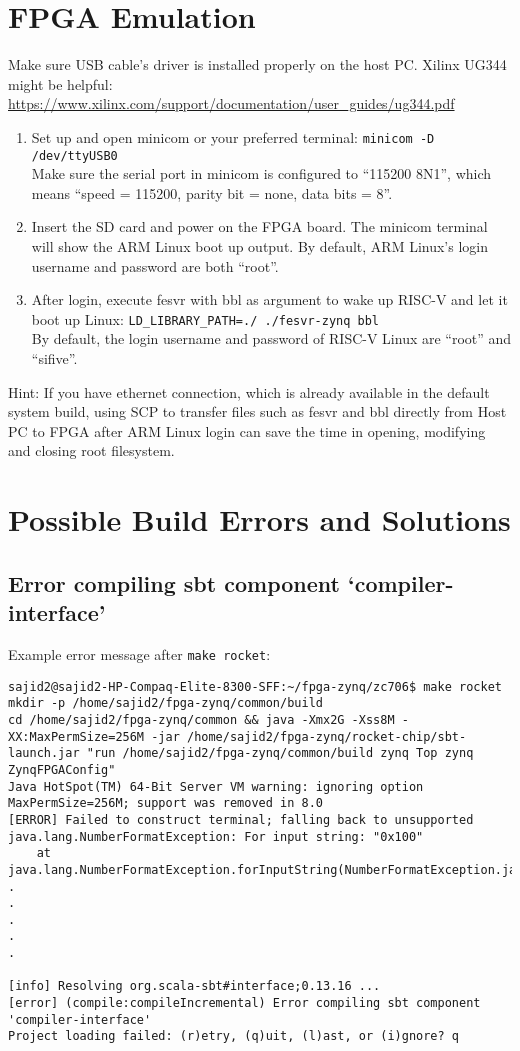 \documentclass[a4paper,11pt]{article}
\begin{document}
\section{FPGA Emulation}
Make sure USB cable's driver is installed properly on the host PC. Xilinx UG344 might be helpful: \url{https://www.xilinx.com/support/documentation/user_guides/ug344.pdf}
\begin{enumerate}
\item Set up and open minicom or your preferred terminal:
{\tt minicom -D /dev/ttyUSB0}\\
Make sure the serial port in minicom is configured to ``115200 8N1'', which means ``speed = 115200, parity bit = none, data bits = 8''.

\item Insert the SD card and power on the FPGA board. The minicom terminal will show the ARM Linux boot up output. By default, ARM Linux's login username and password are both ``root''.

\item After login, execute fesvr with bbl as argument to wake up RISC-V and let it boot up Linux:
{\tt LD\_LIBRARY\_PATH=./ ./fesvr-zynq bbl}\\
By default, the login username and password of RISC-V Linux are ``root'' and ``sifive''.
\end{enumerate}

Hint: If you have ethernet connection, which is already available in the default system build, using SCP to transfer files such as fesvr and bbl directly from Host PC to FPGA after ARM Linux login can save the time in opening, modifying and closing root filesystem.

\section{Possible Build Errors and Solutions}\label{sec_errors}
\subsection{Error compiling sbt component  `compiler-interface'}
Example error message after {\tt make rocket}:
\begin{lstlisting}
sajid2@sajid2-HP-Compaq-Elite-8300-SFF:~/fpga-zynq/zc706$ make rocket
mkdir -p /home/sajid2/fpga-zynq/common/build
cd /home/sajid2/fpga-zynq/common && java -Xmx2G -Xss8M -XX:MaxPermSize=256M -jar /home/sajid2/fpga-zynq/rocket-chip/sbt-launch.jar "run /home/sajid2/fpga-zynq/common/build zynq Top zynq ZynqFPGAConfig"
Java HotSpot(TM) 64-Bit Server VM warning: ignoring option MaxPermSize=256M; support was removed in 8.0
[ERROR] Failed to construct terminal; falling back to unsupported
java.lang.NumberFormatException: For input string: "0x100"
	at java.lang.NumberFormatException.forInputString(NumberFormatException.java:65)
.
.
.
.
.

[info] Resolving org.scala-sbt#interface;0.13.16 ...
[error] (compile:compileIncremental) Error compiling sbt component 'compiler-interface'
Project loading failed: (r)etry, (q)uit, (l)ast, or (i)gnore? q
\end{lstlisting}
\end{document}

